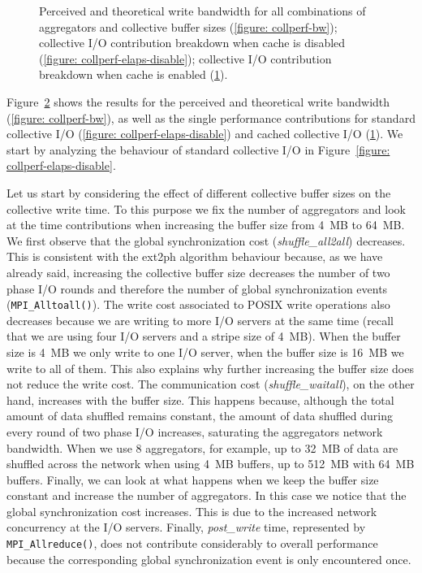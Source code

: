 \begin{figure}[]
\begin{subfigure}[]{\textwidth}
  \caption{}
  \label{figure: collperf-elaps-enable}
  \end{subfigure}
  \caption{Perceived and theoretical write bandwidth for all combinations of aggregators and collective buffer sizes (\ref{figure: collperf-bw}); 
  collective I/O contribution breakdown when cache is disabled (\ref{figure: collperf-elaps-disable}); collective I/O contribution breakdown when cache is 
  enabled (\ref{figure: collperf-elaps-enable}).}
  \label{figure: collperf-results}
\end{figure}

Figure~\ref{figure: collperf-results} shows the results for the perceived and theoretical write bandwidth (\ref{figure: collperf-bw}), as well as the single 
performance contributions for standard collective I/O (\ref{figure: collperf-elaps-disable}) and cached collective I/O (\ref{figure: collperf-elaps-enable}). 
We start by analyzing the behaviour of standard collective I/O in Figure~\ref{figure: collperf-elaps-disable}.

Let us start by considering the effect of different collective buffer sizes on the collective write time. To this purpose we fix the number of aggregators and look at 
the time contributions when increasing the buffer size from 4~MB to 64~MB. We first observe that the global synchronization cost (\textit{shuffle\_all2all}) decreases.
This is consistent with the ext2ph algorithm behaviour because, as we have already said, increasing the collective buffer size decreases the number of two phase I/O rounds
and therefore the number of global synchronization events (\texttt{MPI\_Alltoall()}). The write cost associated to POSIX write operations also decreases because we are
writing to more I/O servers at the same time (recall that we are using four I/O servers and a stripe size of 4~MB). When the buffer size is 4~MB we only write to one
I/O server, when the buffer size is 16~MB we write to all of them. This also explains why further increasing the buffer size does not reduce the write cost. The
communication cost (\textit{shuffle\_waitall}), on the other hand, increases with the buffer size. This happens because, although the total amount of data shuffled remains
constant, the amount of data shuffled during every round of two phase I/O increases, saturating the aggregators network bandwidth. When we use 8 aggregators, for example, 
up to 32~MB of data are shuffled across the network when using 4~MB buffers, up to 512~MB with 64~MB buffers. Finally, we can look at what happens when we keep the
buffer size constant and increase the number of aggregators. In this case we notice that the global synchronization cost increases. This is due to the increased network 
concurrency at the I/O servers. Finally, \textit{post\_write} time, represented by \texttt{MPI\_Allreduce()}, does not contribute considerably to overall performance because
the corresponding global synchronization event is only encountered once.

